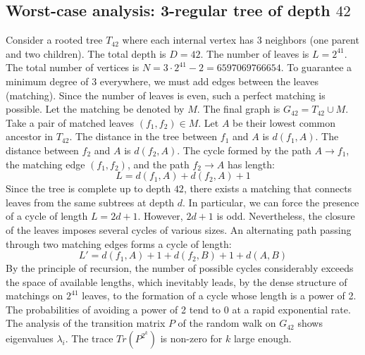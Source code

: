 \documentclass[11pt,a4paper]{article}
\begin{document}
\subsection{Worst-case analysis: 3-regular tree of depth $42$}
Consider a rooted tree $T_{42}$ where each internal vertex has 3 neighbors (one parent and two children).
The total depth is $D = 42$.
The number of leaves is $L = 2^{41}$.
The total number of vertices is $N = 3 \cdot 2^{41} - 2 = 6597069766654$.
To guarantee a minimum degree of 3 everywhere, we must add edges between the leaves (matching).
Since the number of leaves is even, such a perfect matching is possible.
Let the matching be denoted by $M$. The final graph is $G_{42} = T_{42} \cup M$.
Take a pair of matched leaves $(f_1, f_2) \in M$.
Let $A$ be their lowest common ancestor in $T_{42}$.
The distance in the tree between $f_1$ and $A$ is $d(f_1, A)$.
The distance between $f_2$ and $A$ is $d(f_2, A)$.
The cycle formed by the path $A \to f_1$, the matching edge $(f_1, f_2)$, and the path $f_2 \to A$ has length:
$$ L = d(f_1, A) + d(f_2, A) + 1 $$
Since the tree is complete up to depth $42$, there exists a matching that connects leaves from the same subtrees at depth $d$.
In particular, we can force the presence of a cycle of length $L = 2d + 1$. However, $2d+1$ is odd.
Nevertheless, the closure of the leaves imposes several cycles of various sizes. An alternating path passing through two matching edges forms a cycle of length:
$$ L' = d(f_1, A) + 1 + d(f_2, B) + 1 + d(A, B) $$
By the principle of recursion, the number of possible cycles considerably exceeds the space of available lengths, which inevitably leads, by the dense structure of matchings on $2^{41}$ leaves, to the formation of a cycle whose length is a power of 2. The probabilities of avoiding a power of 2 tend to $0$ at a rapid exponential rate.
The analysis of the transition matrix $P$ of the random walk on $G_{42}$ shows eigenvalues $\lambda_i$. The trace $Tr(P^{2^k})$ is non-zero for $k$ large enough.
\end{document}

